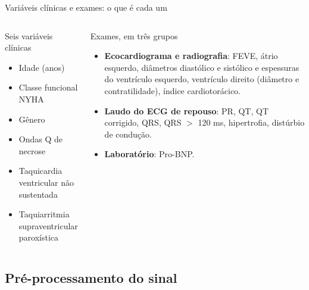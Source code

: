 \documentclass[10pt,aspectratio=169]{beamer}
\begin{document}
\begin{frame}{Variáveis clínicas e exames: o que é cada um}
  \begin{columns}[T]
    \begin{block}{Seis variáveis clínicas}
      \small
      \begin{itemize}
        \item Idade (anos)
        \item Classe funcional NYHA
        \item Gênero
        \item Ondas Q de necrose
        \item Taquicardia ventricular não sustentada
        \item Taquiarritmia supraventricular paroxística
      \end{itemize}
    \end{block}
    \begin{block}{Exames, em três grupos}
      \small
      \begin{itemize}
        \item \textbf{Ecocardiograma e radiografia}: FEVE, átrio esquerdo, diâmetros diastólico e sistólico e espessuras do ventrículo esquerdo, ventrículo direito (diâmetro e contratilidade), índice cardiotorácico.
        \item \textbf{Laudo do ECG de repouso}: PR, QT, QT corrigido, QRS, QRS $>$ 120 ms, hipertrofia, distúrbio de condução.
        \item \textbf{Laboratório}: Pro-BNP.
      \end{itemize}
    \end{block}
  \end{columns}
\end{frame}

\subsection{Pré-processamento do sinal}
\end{document}
